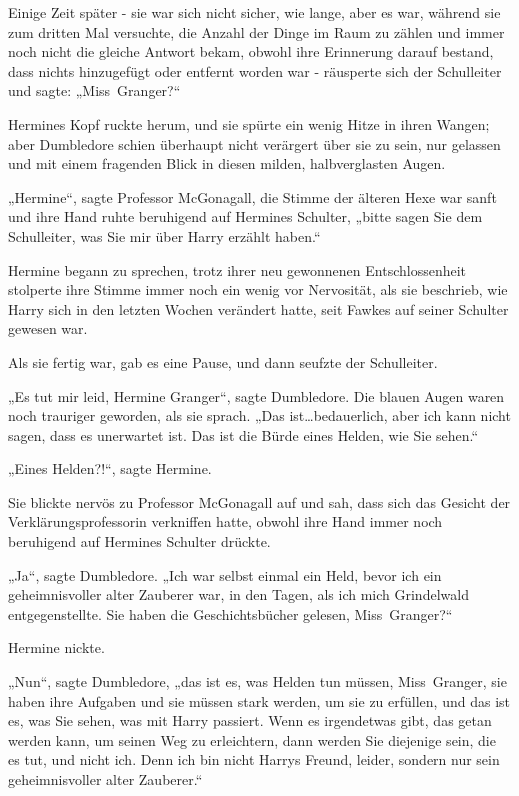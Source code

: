 {Einige Zeit später - sie war sich nicht sicher, wie lange, aber es war, während sie zum dritten Mal versuchte, die Anzahl der Dinge im Raum zu zählen und immer noch nicht die gleiche Antwort bekam, obwohl ihre Erinnerung darauf bestand, dass nichts hinzugefügt oder entfernt worden war - räusperte sich der Schulleiter und sagte: „Miss~Granger?“

Hermines Kopf ruckte herum, und sie spürte ein wenig Hitze in ihren Wangen; aber Dumbledore schien überhaupt nicht verärgert über sie zu sein, nur gelassen und mit einem fragenden Blick in diesen milden, halbverglasten Augen.

„Hermine“, sagte Professor McGonagall, die Stimme der älteren Hexe war sanft und ihre Hand ruhte beruhigend auf Hermines Schulter, „bitte sagen Sie dem Schulleiter, was Sie mir über Harry erzählt haben.“

Hermine begann zu sprechen, trotz ihrer neu gewonnenen Entschlossenheit stolperte ihre Stimme immer noch ein wenig vor Nervosität, als sie beschrieb, wie Harry sich in den letzten Wochen verändert hatte, seit Fawkes auf seiner Schulter gewesen war.

Als sie fertig war, gab es eine Pause, und dann seufzte der Schulleiter.

„Es tut mir leid, Hermine Granger“, sagte Dumbledore. Die blauen Augen waren noch trauriger geworden, als sie sprach. „Das ist…bedauerlich, aber ich kann nicht sagen, dass es unerwartet ist. Das ist die Bürde eines Helden, wie Sie sehen.“

„Eines Helden?!“, sagte Hermine.

Sie blickte nervös zu Professor McGonagall auf und sah, dass sich das Gesicht der Verklärungsprofessorin verkniffen hatte, obwohl ihre Hand immer noch beruhigend auf Hermines Schulter drückte.

„Ja“, sagte Dumbledore. „Ich war selbst einmal ein Held, bevor ich ein geheimnisvoller alter Zauberer war, in den Tagen, als ich mich Grindelwald entgegenstellte. Sie haben die Geschichtsbücher gelesen, Miss~Granger?“

Hermine nickte.

„Nun“, sagte Dumbledore, „das ist es, was Helden tun müssen, Miss~Granger, sie haben ihre Aufgaben und sie müssen stark werden, um sie zu erfüllen, und das ist es, was Sie sehen, was mit Harry passiert. Wenn es irgendetwas gibt, das getan werden kann, um seinen Weg zu erleichtern, dann werden Sie diejenige sein, die es tut, und nicht ich. Denn ich bin nicht Harrys Freund, leider, sondern nur sein geheimnisvoller alter Zauberer.“

}
